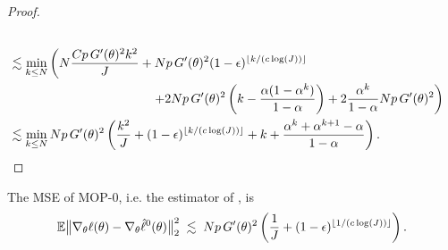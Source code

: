 \begin{proof}
\begin{align}
    \\ \nonumber
    &\lesssim \min_{k \leq N} \left(N\frac{Cp \, G'(\theta)^2k^2}{J} + Np \, G'(\theta)^2(1-\epsilon)^{\floor{k/(c\log(J))}} \right.
    \\
    & \hspace{40mm} \left.
    + 2Np \, G'(\theta)^2\left(k-\frac{\alpha(1-\alpha^k)}{1-\alpha}\right) + 2\frac{\alpha^k}{1-\alpha}Np \, G'(\theta)^2\right) \\
    &\lesssim \min_{k \leq N} Np \, G'(\theta)^2\left(\frac{k^2}{J}+(1-\epsilon)^{\floor{k/(c\log(J))}}+k+\frac{\alpha^k  + \alpha^{k+1} - \alpha}{1-\alpha}\right).
\end{align}

\end{proof}

\begin{cor}
    The MSE of MOP-$0$, i.e. the estimator of \cite{naesseth18}, is
    \begin{equation}
        \mathbb{E}\big\|\nabla_\theta\ell(\theta) - \nabla_\theta \hat\ell^0(\theta)\big\|_2^2 \; \lesssim 
        \; Np \, G'(\theta)^2\left(\frac{1}{J}+(1-\epsilon)^{\lfloor 1/(c\log(J)) \rfloor}\right).
    \end{equation}
\end{cor}
